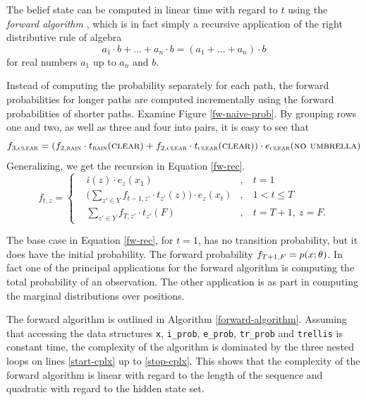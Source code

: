 The belief state can be computed in linear time with regard to $t$
using the {\it forward algorithm} \citep{Rabiner1989}, which is in
fact simply a recursive application of the right distributive rule of
algebra
$$a_1 \cdot b + ... + a_n \cdot b = (a_1 + ... + a_n)\cdot b$$
for real numbers $a_1$ up to $a_n$ and $b$. 

Instead of computing the probability separately for each path, the
forward probabilities for longer paths are computed incrementally
using the forward probabilities of shorter paths. Examine Figure
\ref{fw-naive-prob}. By grouping rows one and two, as well as three
and four into pairs, it is easy to see that
$$f_{3,\textsc{clear}} = (f_{2, \textsc{rain}}\cdot t_{\textsc{rain}}(\textsc{clear}) + f_{2, \textsc{clear}} \cdot t_{\textsc{clear}}(\textsc{clear})) \cdot e_{\textsc{clear}}(\textsc{no\ umbrella})$$
Generalizing, we get the recursion in Equation \eqref{fw-rec}.
\begin{equation}
f_{t, z} = \left\{
\begin{aligned}
&i(z) \cdot e_{z}(x_1)  & , &\  t = 1\\
&\Bigg(\sum_{z'\in Y} f_{t - 1, z'}\cdot t_{z'}(z) \Bigg) \cdot e_{z}(x_{t}) & ,&\ 1 < t \le T\\
&\sum_{z'\in Y} f_{T, z'}\cdot t_{z'}(F) & ,&\  t = T + 1,\ z = F.
\end{aligned}
\right.
\label{fw-rec}\end{equation}

The base case in Equation \eqref{fw-rec}, for $t = 1$, has no
transition probability, but it does have the initial probability. The
forward probability $f_{T + 1, F} = p(x \mbox{$ ; \, $} \theta)$. In fact one
of the principal applications for the forward algorithm is computing
the total probability of an observation. The other application is as
part in computing the marginal distributions over positions.
  
The forward algorithm is outlined in Algorithm
\ref{forward-algorithm}. Assuming that accessing the data structures
{\tt x}, {\tt i_prob}, {\tt e_prob}, {\tt tr_prob} and {\tt trellis}
is constant time, the complexity of the algorithm is dominated by the
three nested loops on lines \ref{start-cplx} up to
\ref{stop-cplx}. This shows that the complexity of the forward
algorithm is linear with regard to the length of the sequence and
quadratic with regard to the hidden state set.

